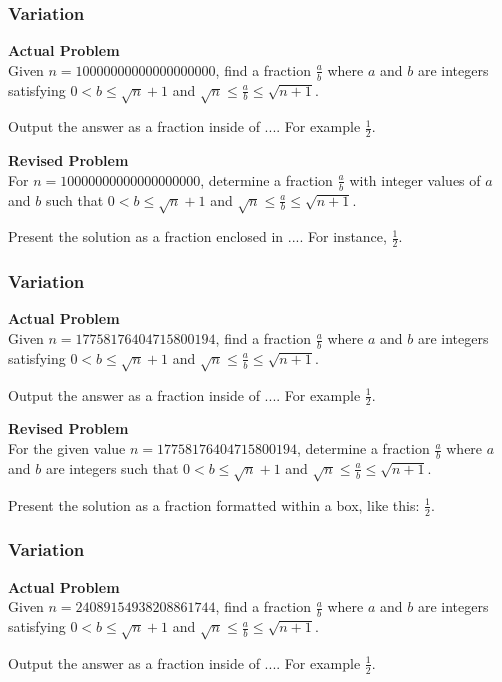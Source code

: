 \subsubsection{Variation}
\textbf{Actual Problem}\\
Given $n = 10000000000000000000$, find a fraction $\frac{a}{b}$ where $a$ and $b$ are integers satisfying $0 < b \leq \sqrt{n}+1$ and $\sqrt{n} \leq \frac{a}{b} \leq \sqrt{n+1}$.

Output the answer as a fraction inside of $\boxed{...}$. For example $\boxed{\frac{1}{2}}$.

\textbf{Revised Problem}\\
For $n = 10000000000000000000$, determine a fraction $\frac{a}{b}$ with integer values of $a$ and $b$ such that $0 < b \leq \sqrt{n} + 1$ and $\sqrt{n} \leq \frac{a}{b} \leq \sqrt{n+1}$.

Present the solution as a fraction enclosed in $\boxed{...}$. For instance, $\boxed{\frac{1}{2}}$.

\subsubsection{Variation}
\textbf{Actual Problem}\\
Given $n = 17758176404715800194$, find a fraction $\frac{a}{b}$ where $a$ and $b$ are integers satisfying $0 < b \leq \sqrt{n}+1$ and $\sqrt{n} \leq \frac{a}{b} \leq \sqrt{n+1}$.

Output the answer as a fraction inside of $\boxed{...}$. For example $\boxed{\frac{1}{2}}$.

\textbf{Revised Problem}\\
For the given value \(n = 17758176404715800194\), determine a fraction \(\frac{a}{b}\) where \(a\) and \(b\) are integers such that \(0 < b \leq \sqrt{n}+1\) and \(\sqrt{n} \leq \frac{a}{b} \leq \sqrt{n+1}\).

Present the solution as a fraction formatted within a box, like this: \(\boxed{\frac{1}{2}}\).

\subsubsection{Variation}
\textbf{Actual Problem}\\
Given $n = 24089154938208861744$, find a fraction $\frac{a}{b}$ where $a$ and $b$ are integers satisfying $0 < b \leq \sqrt{n}+1$ and $\sqrt{n} \leq \frac{a}{b} \leq \sqrt{n+1}$.

Output the answer as a fraction inside of $\boxed{...}$. For example $\boxed{\frac{1}{2}}$.

